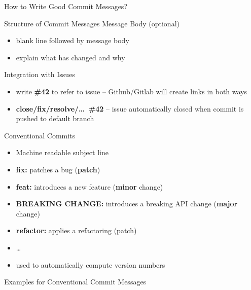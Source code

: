 \begin{frame}{How to Write Good Commit Messages?}
\begin{fancycolumns}
\begin{definition}{Structure of Commit Messages }
			Message Body (optional)
			\vspace{-1mm}
			\begin{itemize}
				\item blank line followed by message body
				\item explain what has changed and why
			\end{itemize}
		\end{definition}
		\vspace{-1mm}
		\begin{note}{Integration with Issues }
			\begin{itemize}
				\item write \textbf{\#42} to refer to issue -- Github/Gitlab will create links in both ways
				\item \textbf{close/fix/resolve/\ldots\ \#42} -- issue automatically closed when commit is pushed to default branch
			\end{itemize}
		\end{note}
		\nextcolumn
		\begin{definition}{Conventional Commits }
			\begin{itemize}
				\item Machine readable subject line
				\item \textbf{fix:} patches a bug (\textbf{patch})
				\item \textbf{feat:} introduces a new feature (\textbf{minor} change)
				\item \textbf{BREAKING CHANGE:} introduces a breaking API change (\textbf{major} change)
				\item \textbf{refactor:} applies a refactoring (patch)
				\item \ldots
				\item used to automatically compute version numbers
			\end{itemize}
		\end{definition}
	\end{fancycolumns}
\end{frame}

\begin{frame}{Examples for Conventional Commit Messages}
	\centering{}
\end{frame}


